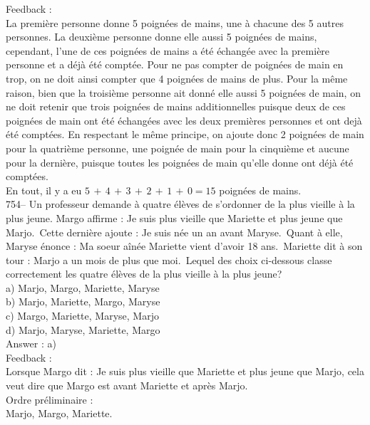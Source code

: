 \documentclass[letterpaper, 12pt]{article}
\begin{document}
Feedback : \\
La premi\`ere personne donne 5 poign\'ees de mains, une \`a chacune
des 5 autres personnes. La deuxi\`eme personne donne elle aussi 5
poign\'ees de mains, cependant, l'une de ces poign\'ees de mains a
\'et\'e \'echang\'ee avec la premi\`ere personne et a d\'ej\`a
\'et\'e compt\'ee. Pour ne pas compter de poign\'ees de main en
trop, on ne doit ainsi compter que 4 poign\'ees de mains de plus.
Pour la m\^eme raison, bien que la troisi\`eme personne ait donn\'e
elle aussi 5 poign\'ees de main, on ne doit retenir que trois
poign\'ees de mains additionnelles puisque deux de ces poign\'ees de
main ont \'et\'e \'echang\'ees avec les deux premi\`eres personnes
et ont dej\`a \'et\'e compt\'ees. En respectant le m\^eme principe,
on ajoute donc 2 poign\'ees de main pour la quatri\`eme personne,
une poign\'ee de main pour la cinqui\`eme et aucune pour la
derni\`ere, puisque toutes les poign\'ees de main qu'elle donne ont
d\'ej\`a
\'et\'e compt\'ees.\\
En tout, il y a eu $5\,+\,4\,+\,3\,+\,2\,+\,1\,+\,0=15$ poign\'ees de
mains.\\

754-- Un professeur demande \`a quatre \'el\`eves de s'ordonner de
la plus vieille \`a la plus jeune.  Margo affirme : \og Je suis plus
vieille que Mariette et plus jeune que Marjo.\fg\  Cette derni\`ere
ajoute : \og Je suis n\'ee un an avant Maryse.\fg\  Quant \`a elle,
Maryse \'enonce : \og Ma soeur a\^in\'ee Mariette vient d'avoir 18
ans.\fg\ Mariette dit \`a son tour : \og Marjo a un mois de plus que
moi.\fg\ Lequel des choix ci-dessous classe correctement les
quatre \'el\`eves de la plus vieille \`a la plus jeune?\\
a) Marjo, Margo, Mariette, Maryse\\
b) Marjo, Mariette, Margo, Maryse\\
c) Margo, Mariette, Maryse, Marjo\\
d) Marjo, Maryse, Mariette, Margo\\

Answer : a)\\

Feedback : \\
Lorsque Margo dit : \og Je suis plus vieille que Mariette et plus
jeune que Marjo\fg , cela veut dire que Margo est avant Mariette et
apr\`es Marjo.\\

Ordre pr\'eliminaire :\\
Marjo, Margo, Mariette.\\
\end{document}

